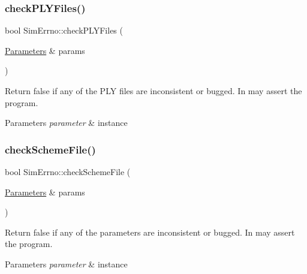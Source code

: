\subsubsection{\texorpdfstring{check\+P\+L\+Y\+Files()}{checkPLYFiles()}}
{\footnotesize\ttfamily bool Sim\+Errno\+::check\+P\+L\+Y\+Files (\begin{DoxyParamCaption}\item[{\hyperlink{class_parameters}{Parameters} \&}]{params }\end{DoxyParamCaption})\hspace{0.3cm}{\ttfamily [static]}}



Return false if any of the P\+LY files are inconsistent or bugged. In may assert the program. 


\begin{DoxyParams}{Parameters}
{\em parameter} & instance \\
\hline
\end{DoxyParams}
\mbox{\label{class_sim_errno_ad5048e2a5f5630118ec614afdd4fd197}} 
\subsubsection{\texorpdfstring{check\+Scheme\+File()}{checkSchemeFile()}}
{\footnotesize\ttfamily bool Sim\+Errno\+::check\+Scheme\+File (\begin{DoxyParamCaption}\item[{\hyperlink{class_parameters}{Parameters} \&}]{params }\end{DoxyParamCaption})\hspace{0.3cm}{\ttfamily [static]}}



Return false if any of the parameters are inconsistent or bugged. In may assert the program. 


\begin{DoxyParams}{Parameters}
{\em parameter} & instance \\
\hline
\end{DoxyParams}
\mbox{\label{class_sim_errno_aabc7284492cb5f8ef38fce7d4501abbd}} 

